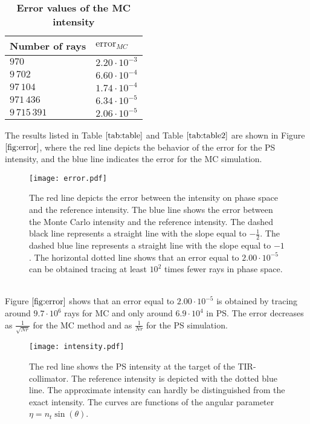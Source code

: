 \begin{table}[htbp]
\centering
\caption{\bf Error values of the MC intensity}
\begin{tabular}{ll} \hline   Number of rays\; & $\mbox{error}_{MC}$\\ \hline $970$  & $2.20\cdot10^{-3}$ \\
$9\,702$  & $6.60\cdot 10^{-4}$  \\ $97\,104$  & $1.74\cdot 10^{-4}$ \\ $971\,436$  & $6.34\cdot 10^{-5}$ \\ $9\,715\,391$  & $2.06\cdot 10^{-5}$ \\
 \hline
 \end{tabular}
 \label{tab:table2}
 \end{table}
\indent The results listed in Table $\ref{tab:table}$ and Table $\ref{tab:table2}$ are shown in Figure $\ref{fig:error}$, where the red line depicts the behavior of the error for the PS
intensity, and the blue line indicates the error for the MC simulation.
\begin{figure}[h!]
  \begin{center}
  \texttt{[image: error.pdf]}
  \end{center}
  \caption{\footnotesize{ The red line depicts the error between the intensity on phase space and the reference intensity.
 The blue line shows the error between the Monte Carlo intensity and the reference intensity.
  The dashed black line represents a straight line with the slope equal to $-\frac{1}{2}$.
  The dashed blue line represents a straight line with the slope equal to $-1$.
  The horizontal dotted line shows that an error equal to $2.00 \cdot  10^{-5}$ can be obtained tracing at least $10^2$ times fewer rays in phase space.}}
  \label{fig:error}
\end{figure}
\\
\indent Figure $\ref{fig:error}$ shows that an error equal to $2.00 \cdot  10^{-5}$ is obtained by tracing around $9.7 \cdot 10^{6}$ rays for
MC and only around $6.9 \cdot 10^4$ in PS. The error decreases as $\frac{1}{\sqrt{Nr}}$ for the MC method and as $\frac{1}{Nr}$ for the PS simulation.
  \begin{figure}[h]
    \centering
    \begin{minipage}[]{.40\textwidth}
    \texttt{[image: intensity.pdf]}

\caption{\footnotesize{The red line shows the PS intensity at the target of the TIR-collimator. The reference intensity is depicted with the dotted blue line.
The approximate intensity can hardly be distinguished from the exact
intensity. The curves are functions of the angular parameter $\eta = n_{t}\sin(\theta)$. }}
  \label{fig:intensityMCPS}
    \end{minipage} \vspace{2em} \qquad \qquad \qquad
  \end{figure}

